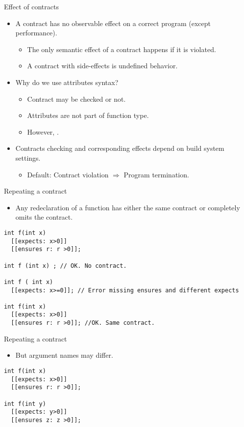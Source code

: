 \begin{frame}[t]{Effect of contracts}
\begin{itemize}
  \item A contract has no observable effect on a correct program (except
performance).
    \begin{itemize}
      \item The only semantic effect of a contract happens if it is violated.
      \item A contract with side-effects is undefined behavior.
    \end{itemize}

  \vfill\pause
  \item Why do we use attributes syntax?
    \begin{itemize}
      \item Contract may be checked or not.
      \item Attributes are not part of function type.
      \item However, .
    \end{itemize}

  \vfill\pause
  \item Contracts checking and corresponding effects depend on build system
settings.
    \begin{itemize}
      \item Default: Contract violation $\Rightarrow$ Program
termination.
    \end{itemize}
\end{itemize}
\end{frame}

\begin{frame}[t,fragile]{Repeating a contract}
\begin{itemize}
  \item Any redeclaration of a function has either the same contract or
completely omits the contract.
\end{itemize}
\vfill\pause
\begin{lstlisting}
int f(int x)
  [[expects: x>0]]
  [[ensures r: r >0]];

int f (int x) ; // OK. No contract.

int f ( int x)
  [[expects: x>=0]]; // Error missing ensures and different expects

int f(int x)
  [[expects: x>0]]
  [[ensures r: r >0]]; //OK. Same contract.
\end{lstlisting}
\end{frame}

\begin{frame}[t,fragile]{Repeating a contract}
\begin{itemize}
  \item But argument names may differ.
\end{itemize}

\vfill\pause
\begin{lstlisting}
int f(int x)
  [[expects: x>0]]
  [[ensures r: r >0]];

int f(int y)
  [[expects: y>0]]
  [[ensures z: z >0]];


\end{lstlisting}
\end{frame}

